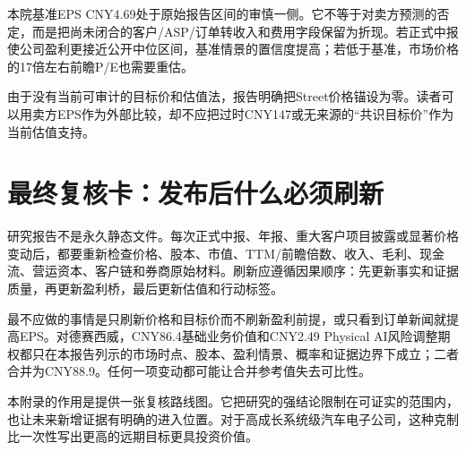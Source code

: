 本院基准EPS CNY4.69处于原始报告区间的审慎一侧。它不等于对卖方预测的否定，而是把尚未闭合的客户/ASP/订单转收入和费用字段保留为折现。若正式中报使公司盈利更接近公开中位区间，基准情景的置信度提高；若低于基准，市场价格的17倍左右前瞻P/E也需要重估。

由于没有当前可审计的目标价和估值法，报告明确把Street价格锚设为零。读者可以用卖方EPS作为外部比较，却不应把过时CNY147或无来源的“共识目标价”作为当前估值支持。

\section{最终复核卡：发布后什么必须刷新}

研究报告不是永久静态文件。每次正式中报、年报、重大客户项目披露或显著价格变动后，都要重新检查价格、股本、市值、TTM/前瞻倍数、收入、毛利、现金流、营运资本、客户链和券商原始材料。刷新应遵循因果顺序：先更新事实和证据质量，再更新盈利桥，最后更新估值和行动标签。

最不应做的事情是只刷新价格和目标价而不刷新盈利前提，或只看到订单新闻就提高EPS。对德赛西威，CNY86.4基础业务价值和CNY2.49 Physical AI风险调整期权都只在本报告列示的市场时点、股本、盈利情景、概率和证据边界下成立；二者合并为CNY88.9。任何一项变动都可能让合并参考值失去可比性。

本附录的作用是提供一张复核路线图。它把研究的强结论限制在可证实的范围内，也让未来新增证据有明确的进入位置。对于高成长系统级汽车电子公司，这种克制比一次性写出更高的远期目标更具投资价值。
